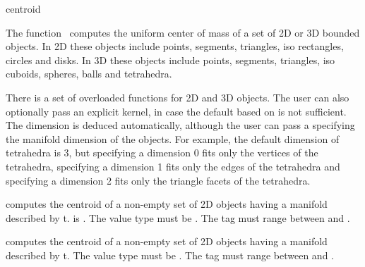
\begin{ccRefFunction}{centroid}  

\ccDefinition
  
The function \ccRefName\ computes the uniform center of mass of a set of 2D or 3D bounded objects. In 2D these objects include points, segments, triangles, iso rectangles, circles and disks. In 3D these objects include points, segments, triangles, iso cuboids, spheres, balls and tetrahedra.


There is a set of overloaded  functions for 2D and 3D objects.
The user can also optionally pass an explicit kernel, in case the default based on  is not sufficient. The dimension is deduced automatically, although the user can pass a  specifying the manifold dimension of the objects. For example, the default dimension of tetrahedra is 3, but specifying a dimension 0 fits only the vertices of the tetrahedra, specifying a dimension 1 fits only the edges of the tetrahedra and specifying a dimension 2 fits only the triangle facets of the tetrahedra.

{ computes the centroid of a non-empty set of 2D objects having a manifold described by t.
   is .  The value type must be . The tag must range between  and .
 }

{ computes the centroid of a non-empty set of 2D objects having a manifold described by t.
  The value type must be . The tag must range between  and .
 }


\end{ccRefFunction}
